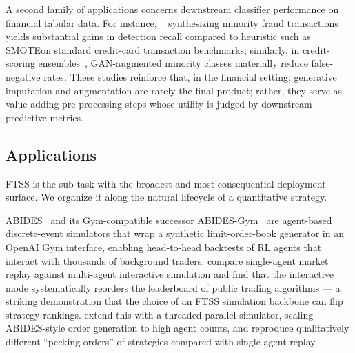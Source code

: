 A second family of applications concerns downstream classifier
performance on financial tabular data. For instance, ~\citep{emaan2025improving} synthesizing minority fraud transactions yields substantial gains
in detection recall compared to heuristic such as
SMOTEon standard credit-card transaction benchmarks;
similarly, in credit-scoring ensembles~\citep{liu2021classification},
GAN-augmented minority classes materially reduce false-negative rates.
These studies reinforce that, in the financial setting, generative
imputation and augmentation are rarely the final product; rather, they
serve as value-adding pre-processing steps whose utility is judged by
downstream predictive metrics.

\subsection{Applications}

FTSS is the sub-task with the broadest and most consequential deployment
surface. We organize it along the natural lifecycle of a quantitative
strategy.

ABIDES~\citep{byrd2019abides} and its Gym-compatible successor
ABIDES-Gym~\citep{amrouni2021abides} are agent-based discrete-event
simulators that wrap a synthetic limit-order-book generator in an
OpenAI Gym interface, enabling head-to-head backtests of RL agents that
interact with thousands of background traders.
\citep{balch2019how} compare single-agent market replay against
multi-agent interactive simulation and find that the interactive mode
systematically reorders the leaderboard of public trading algorithms
--- a striking demonstration that the choice of an FTSS simulation backbone can flip
strategy rankings. \citep{rollins2020which} extend this with a threaded
parallel simulator, scaling ABIDES-style order generation to high agent
counts, and reproduce qualitatively different ``pecking orders'' of
strategies compared with single-agent replay.

